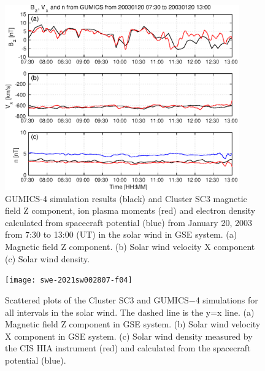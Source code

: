 \documentclass[draft]{agujournal2019}
\begin{document}
\pagebreak

\begin{figure}[h]
\centering
\includegraphics[width=0.9\textwidth,angle=0]{swe-2021sw002807-f03} 
\caption{GUMICS-4 simulation results (black) and Cluster SC3 magnetic field Z component, ion plasma moments (red) and electron density calculated from spacecraft potential (blue) from January 20, 2003 from 7:30 to 13:00 (UT) in the solar wind in GSE system. (a) Magnetic field Z component. (b) Solar wind velocity X component (c) Solar wind density.}
\label{fig:swplot}
\end{figure}

\pagebreak

\begin{figure}[h]
\centering
\texttt{[image: swe-2021sw002807-f04]}
\caption{Scattered plots of the Cluster SC3 and GUMICS$-$4 simulations for all intervals in the solar wind. The dashed line is the y=x line. (a) Magnetic field Z component in GSE system. (b) Solar wind velocity X component in GSE system. (c) Solar wind density measured by the CIS HIA instrument (red) and calculated from the spacecraft potential (blue).}
\label{fig:swscatplot}
\end{figure}

\pagebreak
\end{document}
